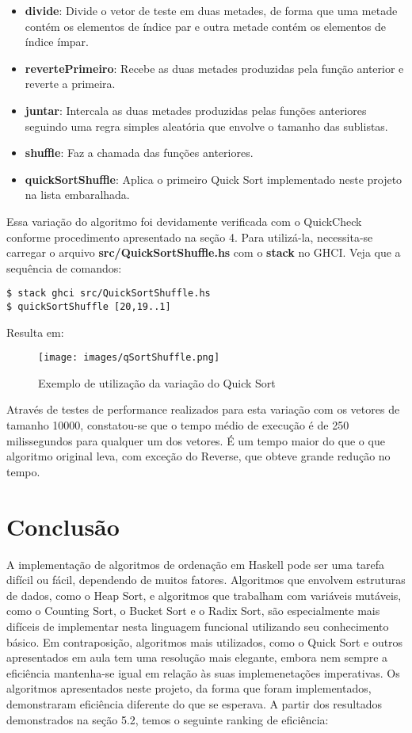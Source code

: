 \documentclass[12pt,a4paper]{article}
\begin{document}
\begin{itemize}
\item \textbf{divide}: Divide o vetor de teste em duas metades, de forma que uma metade contém os elementos de índice par e outra metade contém os elementos de índice ímpar.
\item \textbf{revertePrimeiro}: Recebe as duas metades produzidas pela função anterior e reverte a primeira.
\item \textbf{juntar}: Intercala as duas metades produzidas pelas funções anteriores seguindo uma regra simples aleatória que envolve o tamanho das sublistas.
\item \textbf{shuffle}: Faz a chamada das funções anteriores.
\item \textbf{quickSortShuffle}: Aplica o primeiro Quick Sort implementado neste projeto na lista embaralhada. 
\end{itemize}

Essa variação do algoritmo foi devidamente verificada com o QuickCheck conforme procedimento apresentado na seção 4. Para utilizá-la, necessita-se carregar o arquivo \textbf{src/QuickSortShuffle.hs} com o \textbf{stack} no GHCI. Veja que a sequência de comandos:

\begin{lstlisting}
$ stack ghci src/QuickSortShuffle.hs
$ quickSortShuffle [20,19..1]
\end{lstlisting}

Resulta em:

\begin{figure}[h]
	\centering
	\texttt{[image: images/qSortShuffle.png]}
	\caption{Exemplo de utilização da variação do Quick Sort}
\end{figure}

Através de testes de performance realizados para esta variação com os vetores de tamanho 10000, constatou-se que o tempo médio de execução é de 250 milissegundos para qualquer um dos vetores. É um tempo maior do que o que algoritmo original leva, com exceção do Reverse, que obteve grande redução no tempo. 

\section{Conclusão}
A implementação de algoritmos de ordenação em Haskell pode ser uma tarefa difícil ou fácil, dependendo de muitos fatores. Algoritmos que envolvem estruturas de dados, como o Heap Sort, e algoritmos que trabalham com variáveis mutáveis, como o Counting Sort, o Bucket Sort e o Radix Sort, são especialmente mais difíceis de implementar nesta linguagem funcional utilizando seu conhecimento básico. Em contraposição, algoritmos mais utilizados, como o Quick Sort e outros apresentados em aula tem uma resolução mais elegante, embora nem sempre a eficiência mantenha-se igual em relação às suas implemenetações imperativas. Os algoritmos apresentados neste projeto, da forma que foram implementados, demonstraram eficiência diferente do que se esperava. A partir dos resultados demonstrados na seção 5.2, temos o seguinte ranking de eficiência:
\end{document}
